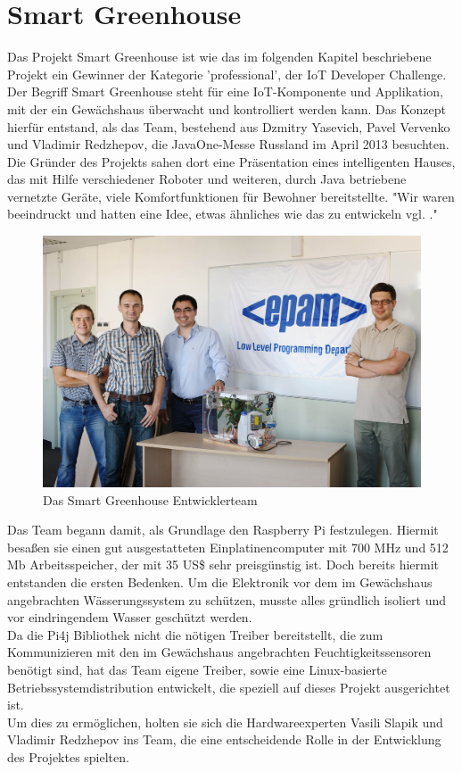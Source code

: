 \section{Smart Greenhouse}\label{s:SmartGreenhouse}

Das Projekt Smart Greenhouse ist wie das im folgenden Kapitel  beschriebene Projekt ein Gewinner der Kategorie 'professional', der IoT Developer Challenge. 
Der Begriff Smart Greenhouse steht für eine \ac{IoT}-Komponente und Applikation, mit der ein Gewächshaus überwacht und kontrolliert werden kann. Das Konzept hierfür entstand, als das Team, bestehend aus Dzmitry Yasevich, Pavel Vervenko und Vladimir Redzhepov, die JavaOne-Messe Russland im April 2013 besuchten. Die Gründer des Projekts sahen dort eine Präsentation eines intelligenten Hauses, das mit Hilfe verschiedener Roboter und weiteren, durch Java betriebene vernetzte Geräte, viele Komfortfunktionen für Bewohner bereitstellte. "Wir waren beeindruckt und hatten eine Idee, etwas ähnliches wie das zu entwickeln vgl. \cite{z:smartgreenhouse}."

\begin{figure}[H] 
	\centering
	\includegraphics[scale=0.1]{Bilder/smartgreenhouse}
	\caption{Das Smart Greenhouse Entwicklerteam\cite{i:smartgreenhouse}}
	\label{f:smartgreenhouse}
\end{figure}

Das Team begann damit, als Grundlage den Raspberry Pi festzulegen. Hiermit besaßen sie einen gut ausgestatteten Einplatinencomputer mit 700 \ac{MHz} und 512 Mb Arbeitsspeicher, der mit 35 US\$ sehr preisgünstig ist. Doch bereits hiermit entstanden die ersten Bedenken. Um die Elektronik vor dem im Gewächshaus angebrachten Wässerungssystem zu schützen, musste alles gründlich isoliert und vor eindringendem Wasser geschützt werden.\\
Da die Pi4j Bibliothek nicht die nötigen Treiber bereitstellt, die zum Kommunizieren mit den im Gewächshaus angebrachten Feuchtigkeitssensoren benötigt sind, hat das Team eigene Treiber, sowie eine Linux-basierte Betriebssystemdistribution entwickelt, die speziell auf dieses Projekt ausgerichtet ist.\\
Um dies zu ermöglichen, holten sie sich die Hardwareexperten Vasili Slapik und Vladimir Redzhepov ins Team, die eine entscheidende Rolle in der Entwicklung des Projektes spielten.

